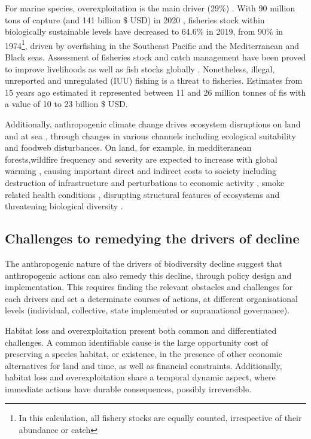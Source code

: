 For marine species, overexploitation is the main driver (29\%) \citep{ipbes_2022_6417333}. With 90 million tons of capture  (and 141 billion \$ USD)  in 2020 \citep{fao_2022_state}, fisheries stock within biologically sustainable levels have decreased to 64.6\% in 2019, from 90\% in 1974\footnote{ In this calculation, all fishery stocks are equally counted, irrespective of their abundance or catch}, driven by overfishing in the Southeast Pacific and the Mediterranean and Black seas. Assessment of fisheries stock and catch management have been proved to improve livelihoods as well as fish stocks globally \citep{melnychuk_2017_fisheries, hilborn_2020_effective}. Nonetheless, illegal, unreported and unregulated (IUU) fishing is a threat to fisheries. Estimates from 15 years ago \citep{agnew_estimating_2009} estimated it represented between 11 and 26 million tonnes of fis with a value of 10 to 23 billion \$ USD. 
 
Additionally, anthropogenic climate change drives ecosystem disruptions on land \citep{burrell_anthropogenic_2020, conradi_reassessment_2024} and at sea \citep{gomes_marine_2024}, through changes in various channels including ecological suitability and foodweb disturbances. On land, for example, in medditeranean forests,wildfire frequency and severity are expected to increase with global warming \citep{Dupuy2019ClimateCI}, causing important direct and indirect costs to society including destruction of infrastructure and perturbations to economic activity \citep{wang_economic_2021}, smoke related health conditions \citep{burke_wildfire_2023, heft-neal_behavior_2023}, disrupting structural features of ecosystems \citep{Ayars2023} and threatening biological diversity \citep{Wintle2020}.
 
\subsection*{Challenges to remedying the drivers of decline}

The anthropogenic nature of the drivers of biodiversity decline suggest that anthropogenic actions can also remedy this decline, through policy design and implementation. This requires finding the relevant obstacles and challenges for each drivers and set a determinate courses of actions, at different organisational levels (individual, collective, state implemented or supranational governance).

Habitat loss and overexploitation present both common and differentiated challenges. A common identifiable cause is the large opportunity cost of preserving a species habitat, or existence, in the presence of other economic alternatives for land and time, as well as financial constraints. Additionally, habitat loss and overexploitation share a temporal dynamic aspect, where immediate actions have durable consequences, possibly irreversible.

